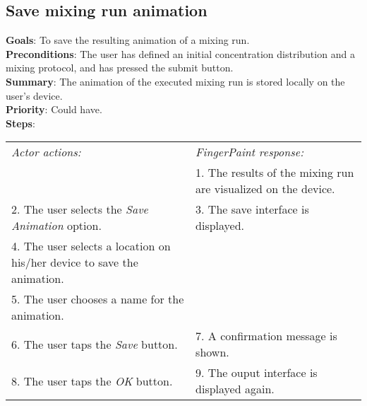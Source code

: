 \begin{appendices}
  \section{Save mixing run animation}
  \textbf{Goals}: To save the resulting animation of a mixing run.\\
  \textbf{Preconditions}: The user has defined an initial concentration distribution and a mixing protocol, and has pressed the submit button.\\
  \textbf{Summary}: The animation of the executed mixing run is stored locally on the user's device.\\
  \textbf{Priority}: Could have.\\
  \textbf{Steps}: \\
  \begin{tabular}{ p{} p{} }
  	\emph{Actor actions:} & \emph{FingerPaint response:} \\
	   & 1. The results of the mixing run are visualized on the device. \\
	 2. The user selects the \emph{Save Animation} option. & 3. The save interface is displayed.\\
	 4. The user selects a location on his/her device to save the animation. & \\
	 5. The user chooses a name for the animation. & \\
	 6. The user taps the \emph{Save} button. & 7. A confirmation message is shown. \\
	 8. The user taps the \emph{OK} button. & 9. The ouput interface is displayed again. \\
  \end{tabular}


\end{appendices}
